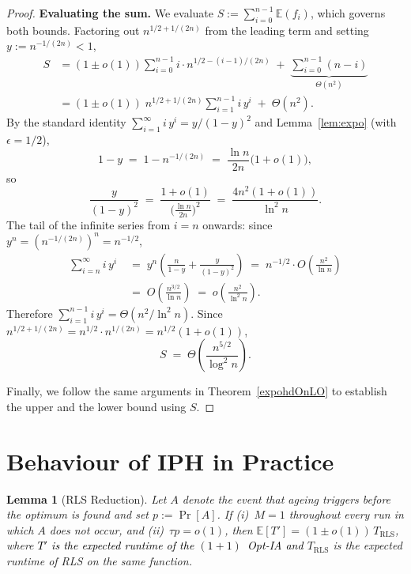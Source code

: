 \documentclass[lettersize,journal]{IEEEtran}
\newcommand{\rerev}[1]{\textcolor{black}{#1}}
\newcommand{\EE}{\mathbb{E}}
\newcommand{\oneoneOPTIA}{$(1+1)$~Opt-IA}
\newtheorem{lemma}{Lemma}
\begin{document}
\begin{proof}
\medskip
\noindent\textbf{Evaluating the sum.}
We evaluate $S := \sum_{i=0}^{n-1} \EE(f_i)$, which governs both bounds.
Factoring out $n^{1/2+1/(2n)}$ from the leading term and setting
$y:=n^{-1/(2n)}<1$,
\begin{align*}
S
&= (1\pm o(1))\sum_{i=0}^{n-1} i\cdot n^{1/2-(i-1)/(2n)}
   \;+\;\underbrace{\sum_{i=0}^{n-1}(n-i)}_{\Theta(n^2)} \\
&= (1\pm o(1))\;n^{1/2+1/(2n)}\sum_{i=1}^{n-1} i\,y^{i}
   \;+\;\Theta(n^2).
\end{align*}
By the standard identity $\sum_{i=1}^{\infty} i\,y^i = y/(1-y)^2$
and Lemma~\ref{lem:expo} (with $\epsilon=1/2$),
\[
1-y \;=\; 1 - n^{-1/(2n)}
    \;=\; \frac{\ln n}{2n}\bigl(1+o(1)\bigr),
\]
so
\[
\frac{y}{(1-y)^2}
\;=\; \frac{1+o(1)}{\bigl(\frac{\ln n}{2n}\bigr)^2}
\;=\; \frac{4n^2(1+o(1))}{\ln^2 n}.
\]
The tail of the infinite series from $i=n$ onwards:
since $y^n = (n^{-1/(2n)})^n = n^{-1/2}$,
\begin{align*}
\sum_{i=n}^{\infty} i\,y^i
\;&=\; y^n\!\left(\frac{n}{1-y}+\frac{y}{(1-y)^2}\right)
\;=\; n^{-1/2}\cdot O\!\left(\frac{n^2}{\ln n}\right)
\\\;&=\; O\!\left(\frac{n^{3/2}}{\ln n}\right)
\;=\; o\!\left(\frac{n^2}{\ln^2 n}\right).
\end{align*}
Therefore $\sum_{i=1}^{n-1} i\,y^{i} = \Theta(n^2/\ln^2 n)$.
Since $n^{1/2+1/(2n)} = n^{1/2}\cdot n^{1/(2n)} = n^{1/2}(1+o(1))$,
\begin{equation}\label{eq:S-expoHD}
S \;=\; \Theta\!\left(\frac{n^{5/2}}{\log^2 n}\right).
\end{equation}

Finally, we follow the same arguments in Theorem~\ref{expohdOnLO} to establish the upper and the lower bound using $S$.
\end{proof}




 	
 	\section{Behaviour of IPH in Practice}


\setcounter{lemma}{2}
\begin{lemma}[RLS Reduction]%
Let $A$ denote the event that ageing triggers before the optimum is found
and set $p:=\Pr[A]$.
If \emph{(i)}~$M=1$ throughout every run in which $A$ does not occur, and
\emph{(ii)}~$\tau p=o(1)$,
then $\EE[T']=(1\pm o(1))\,T_{\mathrm{RLS}}$,
where \rerev{$T'$ is the expected runtime of the \oneoneOPTIA{} and} $T_{\mathrm{RLS}}$ is the expected runtime of RLS
 on the same function.
\end{lemma}
\end{document}
